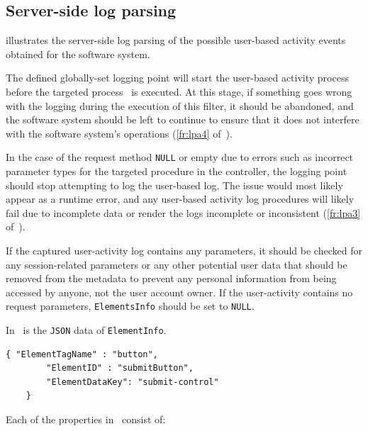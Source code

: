 \clearpage

\subsection{Server-side log parsing}
 illustrates the server-side log parsing of the possible user-based activity events obtained for the software system.\par The defined globally-set logging point will start the user-based activity process before the targeted process~ is executed. At this stage, if something goes wrong with the logging during the execution of this filter, it should be abandoned, and the software system should be left to continue to ensure that it does not interfere with the software system's operations (\ref{fr:lpa4} of~). \par In the case of the request method \texttt{NULL} or empty due to errors such as incorrect parameter types for the targeted procedure in the controller, the logging point should stop attempting to log the user-based log. The issue would most likely appear as a runtime error, and any user-based activity log procedures will likely fail due to incomplete data or render the logs incomplete or inconsistent (\ref{fr:lpa3} of~). \par If the captured user-activity log contains any parameters, it should be checked for any session-related parameters or any other potential user data that should be removed from the metadata to prevent any personal information from being accessed by anyone, not the user account owner. If the user-activity contains no request parameters, \texttt{ElementsInfo} should be set to \texttt{NULL}.\par In~ is the \texttt{JSON} data of \texttt{ElementInfo}. 

\begin{lstlisting}[style=json, caption={\textit{Element properties JSON}}, label={fig:Ch2_ElementInfo}] 
	{ "ElementTagName" : "button",
		"ElementID" : "submitButton",
		"ElementDataKey": "submit-control"		
	}
\end{lstlisting}

Each of the properties in~ consist of:

